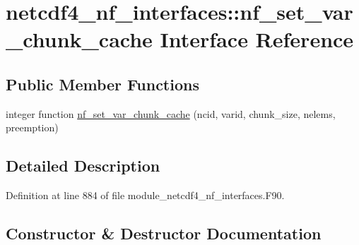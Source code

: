 \hypertarget{interfacenetcdf4__nf__interfaces_1_1nf__set__var__chunk__cache}{}\section{netcdf4\+\_\+nf\+\_\+interfaces\+:\+:nf\+\_\+set\+\_\+var\+\_\+chunk\+\_\+cache Interface Reference}
\label{interfacenetcdf4__nf__interfaces_1_1nf__set__var__chunk__cache}
\subsection*{Public Member Functions}
\begin{DoxyCompactItemize}
\item 
integer function \hyperlink{interfacenetcdf4__nf__interfaces_1_1nf__set__var__chunk__cache_a9fd5eaad3c147b9573a1273f509af6bf}{nf\+\_\+set\+\_\+var\+\_\+chunk\+\_\+cache} (ncid, varid, chunk\+\_\+size, nelems, preemption)
\end{DoxyCompactItemize}


\subsection{Detailed Description}


Definition at line 884 of file module\+\_\+netcdf4\+\_\+nf\+\_\+interfaces.\+F90.



\subsection{Constructor \& Destructor Documentation}
\mbox{\label{interfacenetcdf4__nf__interfaces_1_1nf__set__var__chunk__cache_a9fd5eaad3c147b9573a1273f509af6bf}} 
